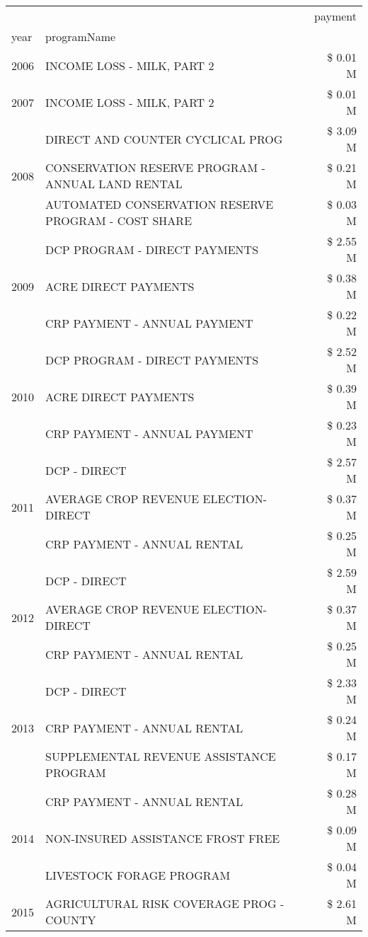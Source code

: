 \begin{tabular}{llr}
\toprule
 &  & payment \\
year & programName &  \\
\midrule
2006 & INCOME LOSS - MILK, PART 2 & \$ 0.01 M \\
\cline{1-3}
2007 & INCOME LOSS - MILK, PART 2 & \$ 0.01 M \\
\cline{1-3}
\multirow[t]{3}{*}{2008} & DIRECT AND COUNTER CYCLICAL PROG & \$ 3.09 M \\
 & CONSERVATION RESERVE PROGRAM - ANNUAL LAND RENTAL & \$ 0.21 M \\
 & AUTOMATED CONSERVATION RESERVE PROGRAM - COST SHARE & \$ 0.03 M \\
\cline{1-3}
\multirow[t]{3}{*}{2009} & DCP PROGRAM - DIRECT PAYMENTS & \$ 2.55 M \\
 & ACRE DIRECT PAYMENTS & \$ 0.38 M \\
 & CRP PAYMENT - ANNUAL PAYMENT & \$ 0.22 M \\
\cline{1-3}
\multirow[t]{3}{*}{2010} & DCP PROGRAM - DIRECT PAYMENTS & \$ 2.52 M \\
 & ACRE DIRECT PAYMENTS & \$ 0.39 M \\
 & CRP PAYMENT - ANNUAL PAYMENT & \$ 0.23 M \\
\cline{1-3}
\multirow[t]{3}{*}{2011} & DCP - DIRECT & \$ 2.57 M \\
 & AVERAGE CROP REVENUE ELECTION-DIRECT & \$ 0.37 M \\
 & CRP PAYMENT - ANNUAL RENTAL & \$ 0.25 M \\
\cline{1-3}
\multirow[t]{3}{*}{2012} & DCP - DIRECT & \$ 2.59 M \\
 & AVERAGE CROP REVENUE ELECTION-DIRECT & \$ 0.37 M \\
 & CRP PAYMENT - ANNUAL RENTAL & \$ 0.25 M \\
\cline{1-3}
\multirow[t]{3}{*}{2013} & DCP - DIRECT & \$ 2.33 M \\
 & CRP PAYMENT - ANNUAL RENTAL & \$ 0.24 M \\
 & SUPPLEMENTAL REVENUE ASSISTANCE PROGRAM & \$ 0.17 M \\
\cline{1-3}
\multirow[t]{3}{*}{2014} & CRP PAYMENT - ANNUAL RENTAL & \$ 0.28 M \\
 & NON-INSURED ASSISTANCE FROST FREE & \$ 0.09 M \\
 & LIVESTOCK FORAGE PROGRAM & \$ 0.04 M \\
\cline{1-3}
\multirow[t]{3}{*}{2015} & AGRICULTURAL RISK COVERAGE PROG - COUNTY & \$ 2.61 M \\

\end{tabular}
